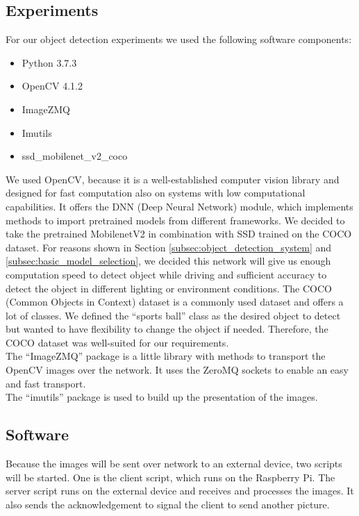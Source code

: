 \subsection{Experiments}

For our object detection experiments we used the following software components:

\begin{itemize}
\itemsep0em
\item Python 3.7.3
\item OpenCV 4.1.2 \cite{tim6}
\item ImageZMQ \cite{tim7}
\item Imutils \cite{tim8}
\item ssd\_mobilenet\_v2\_coco \cite{tim9}
\end{itemize}

We used OpenCV, because it is a well-established computer vision library and designed for fast computation also on systems with low computational capabilities. It offers the DNN (Deep Neural Network) module, which implements methods to import pretrained models from different frameworks. We decided to take the pretrained MobilenetV2 in combination with SSD trained on the COCO dataset. For reasons shown in Section \ref{subsec:object_detection_system} and \ref{subsec:basic_model_selection}, we decided this network will give us enough computation speed to detect object while driving and sufficient accuracy to detect the object in different lighting or environment conditions. The COCO (Common Objects in Context) dataset is a commonly used dataset and offers a lot of classes. We defined the ``sports ball'' class as the desired object to detect but wanted to have flexibility to change the object if needed. Therefore, the COCO dataset was well-suited for our requirements.\\

The ``ImageZMQ'' package is a little library with methods to transport the OpenCV images over the network. It uses the ZeroMQ sockets to enable an easy and fast transport.\\

The ``imutils'' package is used to build up the presentation of the images.

\subsection{Software}

Because the images will be sent over network to an external device, two scripts will be started. One is the client script, which runs on the Raspberry Pi. The server script runs on the external device and receives and processes the images. It also sends the acknowledgement to signal the client to send another picture.

